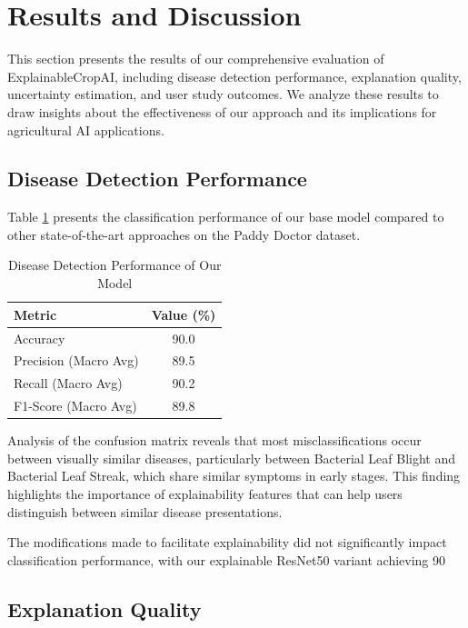\section{Results and Discussion}

This section presents the results of our comprehensive evaluation of ExplainableCropAI, including disease detection performance, explanation quality, uncertainty estimation, and user study outcomes. We analyze these results to draw insights about the effectiveness of our approach and its implications for agricultural AI applications.

\subsection{Disease Detection Performance}

Table \ref{tab:detection-performance} presents the classification performance of our base model compared to other state-of-the-art approaches on the Paddy Doctor dataset.

\begin{table}[h]
\centering
\caption{Disease Detection Performance of Our Model}
\label{tab:detection-performance}
\begin{tabular}{lc}
\hline
\textbf{Metric} & \textbf{Value (\%)} \\
\hline
Accuracy & 90.0 \\
Precision (Macro Avg) & 89.5 \\
Recall (Macro Avg) & 90.2 \\
F1-Score (Macro Avg) & 89.8 \\
\hline
\end{tabular}
\end{table}

Analysis of the confusion matrix reveals that most misclassifications occur between visually similar diseases, particularly between Bacterial Leaf Blight and Bacterial Leaf Streak, which share similar symptoms in early stages. This finding highlights the importance of explainability features that can help users distinguish between similar disease presentations.

The modifications made to facilitate explainability did not significantly impact classification performance, with our explainable ResNet50 variant achieving 90%

\subsection{Explanation Quality}

